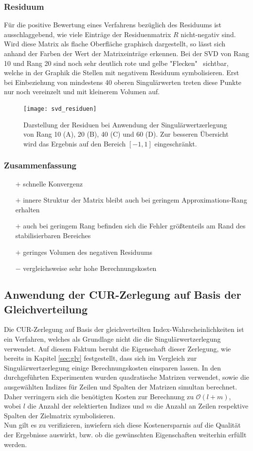 \documentclass[12pt,a4paper,twoside]{article}
\begin{document}
\subsubsection*{Residuum}
Für die positive Bewertung eines Verfahrens bezüglich des Residuums ist ausschlaggebend, wie viele Einträge der Residuenmatrix $R$ nicht-negativ sind. Wird diese Matrix als flache Oberfläche graphisch dargestellt, so lässt sich anhand der Farben der Wert der Matrixeinträge erkennen. Bei der SVD von Rang 10 und Rang 20 sind noch sehr deutlich rote und gelbe "Flecken" \ sichtbar, welche in der Graphik die Stellen mit negativem Residuum symbolisieren. Erst bei  Einbeziehung von mindestens 40 oberen Singulärwerten treten diese Punkte nur noch vereinzelt und mit kleinerem Volumen auf.
\begin{figure}[h]
	\center
	\texttt{[image: svd\_residuen]}
	\caption{Darstellung der Residuen bei Anwendung der Singulärwertzerlegung von Rang 10 (A), 20 (B), 40 (C) und 60 (D). Zur besseren Übersicht wird das Ergebnis auf den Bereich $[-1,1]$ eingeschränkt.}
\end{figure}
\subsubsection*{Zusammenfassung}
\begin{itemize}
	\item[$+$] schnelle Konvergenz
	\item[$+$] innere Struktur der Matrix bleibt auch bei geringem Approximations-Rang erhalten
	\item[$+$] auch bei geringem Rang befinden sich die Fehler größtenteils am Rand des stabilisierbaren Bereiches
	\item[$+$] geringes Volumen des negativen Residuums
	\item[$-$] vergleichsweise sehr hohe Berechnungskosten
\end{itemize}
\newpage
\subsection{Anwendung der CUR-Zerlegung auf Basis der Gleichverteilung}
\label{sec:gleichv}
Die CUR-Zerlegung auf Basis der gleichverteilten Index-Wahrscheinlichkeiten ist ein Verfahren, welches als Grundlage nicht die die Singulärwertzerlegung verwendet. Auf diesem Faktum beruht die Eigenschaft dieser Zerlegung, wie bereits in Kapitel \ref{sec:glv} festgestellt, dass sich im Vergleich zur Singulärwertzerlegung einige Berechnungskosten einsparen lassen. In den durchgeführten Experimenten wurden quadratische Matrizen verwendet, sowie die ausgewählten Indizes für Zeilen und Spalten der Matrizen simultan berechnet. Daher verringern sich die benötigten Kosten zur Berechnung zu $\mathcal{O}(l+m)$, wobei $l$ die Anzahl der selektierten Indizes und $m$ die Anzahl an Zeilen respektive Spalten der Zielmatrix symbolisieren.\\
Nun gilt es zu verifizieren, inwiefern sich diese Kostenersparnis auf die Qualität der Ergebnisse auswirkt, bzw. ob die gewünschten Eigenschaften weiterhin erfüllt werden.
\end{document}
